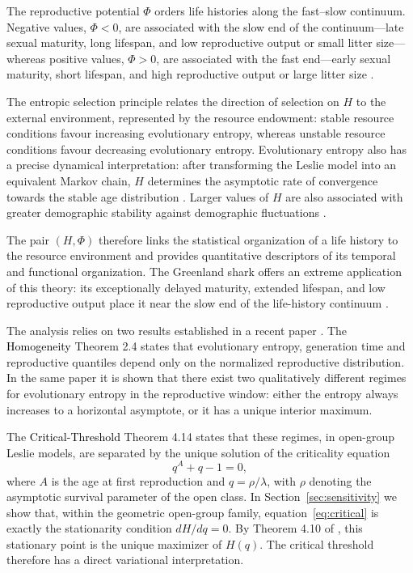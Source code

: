 \documentclass[11pt,a4paper]{amsart}
\begin{document}
The reproductive potential $\Phi$ orders life histories along the fast--slow
continuum. Negative values, $\Phi<0$, are associated with the slow end of the
continuum---late sexual maturity, long lifespan, and low reproductive output
or small litter size---whereas positive values, $\Phi>0$, are associated with
the fast end---early sexual maturity, short lifespan, and high reproductive
output or large litter size
\cite{Demetrius97,Demetrius2000,Demetrius09,
Demetrius2023SelfOrganization}.

The entropic selection principle relates the direction of selection on $H$ to
the external environment, represented by the resource endowment: stable
resource conditions favour increasing evolutionary entropy, whereas unstable
resource conditions favour decreasing evolutionary entropy. Evolutionary entropy also has a precise dynamical interpretation:
after transforming the Leslie model into an equivalent Markov chain,
$H$ determines the asymptotic rate of convergence towards the stable
age distribution
\cite{Tuljapurkar1982}. Larger values of $H$ are also associated
with greater demographic stability against demographic fluctuations
\cite{Demetrius04,DemetriusGundlach2014}.

The pair $(H,\Phi)$
therefore links the statistical organization of a life history to the resource
environment and provides quantitative descriptors of its temporal and
functional organization. The Greenland shark offers an extreme application of
this theory: its exceptionally delayed maturity, extended lifespan, and low
reproductive output place it near the slow end of the life-history continuum
\cite{Nielsen2016GreenlandShark,Gravel2024}.
\endgroup

The analysis relies on two results established in a recent paper
\cite{BuescuElaydiOliveira2026}. The \textcolor{black}{Homogeneity} Theorem 2.4 states
that evolutionary entropy, generation time and reproductive quantiles
depend only on the normalized reproductive distribution. In the same
paper it is shown that there exist two qualitatively different regimes
for evolutionary entropy in the reproductive window: either the entropy
always increases to a horizontal asymptote, or it has a unique interior
maximum.

The \textcolor{black}{Critical-Threshold} Theorem 4.14 states that these regimes, in
open-group Leslie models, are separated by the unique solution of the
criticality equation
\begin{equation}
\label{eq:critical}
q^A+q-1=0,
\end{equation}
where \(A\) is the age at first reproduction and \(q=\rho/\lambda\),
with \(\rho\) denoting the asymptotic survival parameter of the open
class. In Section~\ref{sec:sensitivity} we show that, within the
geometric open-group family, equation~\eqref{eq:critical} is exactly
the stationarity condition \(dH/dq=0\). By Theorem 4.10 of
\cite{BuescuElaydiOliveira2026}, this stationary point is the unique
maximizer of \(H(q)\). The critical threshold therefore has a direct
variational interpretation.
\end{document}

